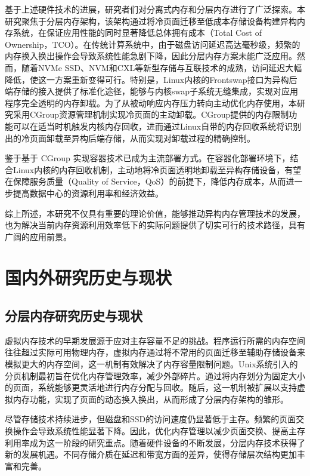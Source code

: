 基于上述硬件技术的进展，研究者们对分离式内存和分层内存进行了广泛探索。本研究聚焦于分层内存架构，该架构通过将冷页面迁移至低成本存储设备构建异构内存系统，在保证应用性能的同时显著降低总体拥有成本（Total Cost of Ownership，TCO）。在传统计算系统中，由于磁盘访问延迟高达毫秒级，频繁的内存换入换出操作会导致系统性能急剧下降，因此分层内存方案未能广泛应用。然而，随着NVMe SSD、NVM和CXL等新型存储与互联技术的成熟，访问延迟大幅降低，使这一方案重新变得可行。特别是，Linux内核的Frontswap接口为异构后端存储的接入提供了标准化途径，能够与内核swap子系统无缝集成，实现对应用程序完全透明的内存卸载。为了从被动响应内存压力转向主动优化内存使用，本研究采用CGroup资源管理机制实现冷页面的主动卸载。CGroup提供的内存限制功能可以在适当时机触发内核内存回收，进而通过Linux自带的内存回收系统将识别出的冷页面卸载至异构后端存储，从而实现对卸载过程的精确控制。

鉴于基于 CGroup 实现容器技术已成为主流部署方式。在容器化部署环境下，结合Linux内核的内存回收机制，主动地将冷页面透明地卸载至异构存储设备，有望在保障服务质量（Quality of Service，QoS）的前提下，降低内存成本，从而进一步提高数据中心的资源利用率和经济效益。

综上所述，本研究不仅具有重要的理论价值，能够推动异构内存管理技术的发展，也为解决当前内存资源利用效率低下的实际问题提供了切实可行的技术路径，具有广阔的应用前景。

\section{国内外研究历史与现状}

\subsection{分层内存研究历史与现状}

虚拟内存技术的早期发展源于应对主存容量不足的挑战。程序运行所需的内存空间往往超过实际可用物理内存，虚拟内存通过将不常用的页面迁移至辅助存储设备来模拟更大的内存空间，这一机制有效解决了内存容量限制问题。Unix系统引入的分页机制最初旨在优化内存管理效率，减少外部碎片。通过将内存划分为固定大小的页面，系统能够更灵活地进行内存分配与回收。随后，这一机制被扩展以支持虚拟内存功能，实现了页面的动态换入换出，从而形成了分层内存架构的雏形。

尽管存储技术持续进步，但磁盘和SSD的访问速度仍显著低于主存。频繁的页面交换操作会导致系统性能显著下降。因此，优化内存管理以减少页面交换、提高主存利用率成为这一阶段的研究重点。随着硬件设备的不断发展，分层内存技术获得了新的发展机遇。不同存储介质在延迟和带宽方面的差异，使得存储层次结构更加丰富和完善。

